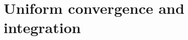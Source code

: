 \section{Uniform convergence and integration}
\label{sec:analysis-i:uniform-convergence-and-integration}


